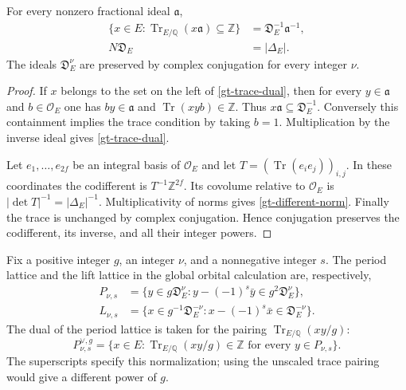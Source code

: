 \begin{lemma}\label{gt-different}
For every nonzero fractional ideal $\mathfrak a$,
\begin{align}
 \{x\in E:\operatorname{Tr}_{E/\mathbb Q}(x\mathfrak a)
                    \subseteq\mathbb Z\}
       &=\mathfrak D_E^{-1}\mathfrak a^{-1},
          \label{gt-trace-dual}\\
 N\mathfrak D_E&=|\Delta_E|.\label{gt-different-norm}
\end{align}
The ideals $\mathfrak D_E^\nu$ are preserved by complex
conjugation for every integer $\nu$.
\end{lemma}

\begin{proof}
If $x$ belongs to the set on the left of \eqref{gt-trace-dual},
then for every $y\in\mathfrak a$ and $b\in\mathcal O_E$ one has
$by\in\mathfrak a$ and $\operatorname{Tr}(xyb)\in\mathbb Z$.
Thus $x\mathfrak a\subseteq\mathfrak D_E^{-1}$.  Conversely
this containment implies the trace condition by taking $b=1$.
Multiplication by the inverse ideal gives
\eqref{gt-trace-dual}.

Let $e_1,\ldots,e_{2f}$ be an integral basis of $\mathcal O_E$
and let $T=(\operatorname{Tr}(e_ie_j))_{i,j}$.  In these coordinates
the codifferent is $T^{-1}\mathbb Z^{2f}$.  Its covolume relative
to $\mathcal O_E$ is $|\det T|^{-1}=|\Delta_E|^{-1}$.
Multiplicativity of norms gives \eqref{gt-different-norm}.
Finally the trace is unchanged by complex conjugation.  Hence
conjugation preserves the codifferent, its inverse, and all their
integer powers.
\end{proof}

Fix a positive integer $g$, an integer $\nu$, and a nonnegative
integer $s$.  The period lattice and the lift lattice in the global
orbital calculation are, respectively,
\begin{align}
 P_{\nu,s}
   &=\{y\in g\mathfrak D_E^\nu:
                    y-(-1)^s\bar y\in g^2\mathfrak D_E^\nu\},
           \label{gt-period-lattice}\\
 L_{\nu,s}
   &=\{x\in g^{-1}\mathfrak D_E^{-\nu}:
                    x-(-1)^s\bar x\in\mathfrak D_E^{-\nu}\}.
           \label{gt-lift-lattice}
\end{align}
The dual of the period lattice is taken for the pairing
$\operatorname{Tr}_{E/\mathbb Q}(xy/g)$:
\begin{equation}\label{gt-period-dual-definition}
 P_{\nu,s}^{\vee,g}
   =\{x\in E:\operatorname{Tr}_{E/\mathbb Q}(xy/g)
                    \in\mathbb Z\text{ for every }y\in P_{\nu,s}\}.
\end{equation}
The superscripts specify this normalization; using the unscaled
trace pairing would give a different power of $g$.

